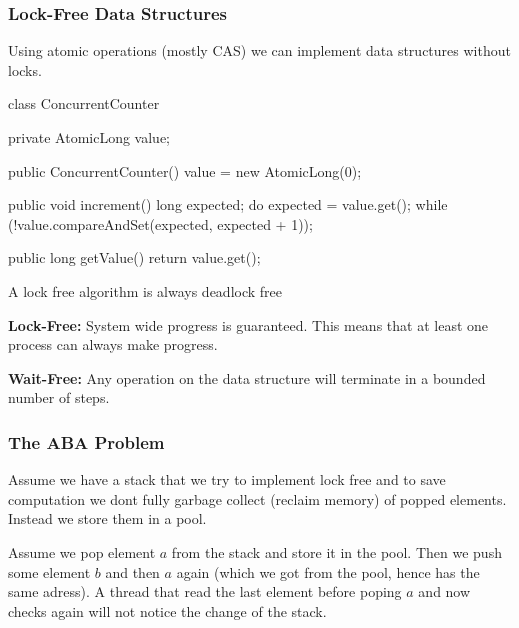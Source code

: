 \subsubsection{Lock-Free Data Structures}

\begin{remark}
    Using atomic operations (mostly CAS) we can implement data structures without locks. 
\end{remark}

\begin{codeexample}
class ConcurrentCounter {
    private AtomicLong value;
    
    public ConcurrentCounter() {
        value = new AtomicLong(0);
    }
    
    public void increment() {
        long expected;
        do {
            expected = value.get();
        } while (!value.compareAndSet(expected, expected + 1));
    }
    
    public long getValue() {
        return value.get();
    }
}
\end{codeexample}

\begin{remark}
    A lock free algorithm is always deadlock free
\end{remark}

\begin{definition}
    \textbf{Lock-Free: } System wide progress is guaranteed. This means that at least one process can always make progress.
\end{definition}

\begin{definition}
    \textbf{Wait-Free: } Any operation on the data structure will terminate in a bounded number of steps.
\end{definition}

\subsubsection{The ABA Problem}

\begin{remark}
    Assume we have a stack that we try to implement lock free and to save computation we dont fully garbage collect (reclaim memory) of popped elements. Instead we store them in a pool.
\end{remark}

\begin{example}
   Assume we pop element $a$ from the stack and store it in the pool. Then we push some element $b$ and then $a$ again (which we got from the pool, hence has the same adress). A thread that read the last element before poping $a$ and now checks again will not notice the change of the stack.
\end{example}

